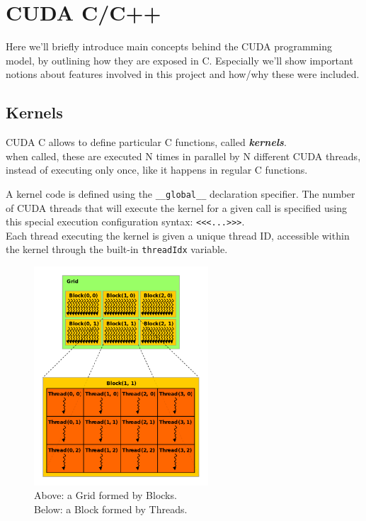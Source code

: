 	
\section{CUDA C/C++}
\label{sect:CUDAcpp}
Here we'll briefly introduce main concepts behind the CUDA programming model, by outlining how they are exposed in C.
Especially we'll show important notions about features involved in this project and how/why these were included.


\subsection{Kernels} 
\label{subs:ker}
CUDA C allows to define particular C functions, called \textbf{\textit{kernels}}.\\
when called, these are executed N times in parallel by N different CUDA threads, instead of executing only once, like it happens in regular C functions.

A kernel code is defined using the \texttt{\_\_global\_\_} declaration specifier. The number of CUDA threads that will execute the kernel for a given call is specified using this special execution configuration syntax: 
\texttt{<<<...>>>}.\\
Each thread executing the kernel is given a unique thread ID, accessible within the kernel through the built-in \texttt{threadIdx} variable\cite{cudaguide}.\\
\begin{figure}
	\raggedleft
	
	\includegraphics[width=0.58\textwidth]{images/gridblocks.png}
	\caption{Above: a Grid formed by Blocks.\\ Below: a Block formed by Threads.}
	\label{fig:gridblock}
\end{figure}

